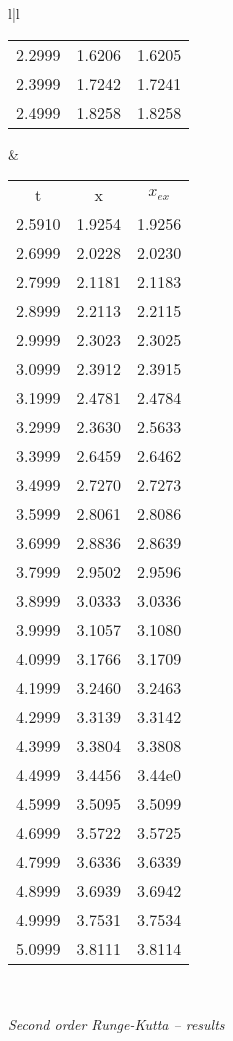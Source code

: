 \begin{figure}
\begin{tabular}{l|l}
\begin{tabular}{ccc}
                2.2999 & 1.6206 & 1.6205  \\
                2.3999 & 1.7242 & 1.7241  \\
                2.4999 & 1.8258 & 1.8258  \\
            \end{tabular}
&
        \begin{tabular}{ccc}
            \multicolumn{1}{c}{t} &  \multicolumn{1}{c}{x}  & \multicolumn{1}{c}{$x_{ex}$}\\
            2.5910 & 1.9254 & 1.9256 \\ 
            2.6999 & 2.0228 & 2.0230 \\ 
            2.7999 & 2.1181 & 2.1183 \\ 
            2.8999 & 2.2113 & 2.2115 \\ 
            2.9999 & 2.3023 & 2.3025 \\ 
            3.0999 & 2.3912 & 2.3915 \\ 
            3.1999 & 2.4781 & 2.4784 \\ 
            3.2999 & 2.3630 & 2.5633 \\ 
            3.3999 & 2.6459 & 2.6462 \\ 
            3.4999 & 2.7270 & 2.7273 \\ 
            3.5999 & 2.8061 & 2.8086 \\ 
            3.6999 & 2.8836 & 2.8639 \\ 
            3.7999 & 2.9502 & 2.9596 \\ 
            3.8999 & 3.0333 & 3.0336 \\ 
            3.9999 & 3.1057 & 3.1080 \\ 
            4.0999 & 3.1766 & 3.1709 \\ 
            4.1999 & 3.2460 & 3.2463 \\ 
            4.2999 & 3.3139 & 3.3142 \\ 
            4.3999 & 3.3804 & 3.3808 \\ 
            4.4999 & 3.4456 & 3.44e0 \\ 
            4.5999 & 3.5095 & 3.5099 \\ 
            4.6999 & 3.5722 & 3.5725 \\ 
            4.7999 & 3.6336 & 3.6339 \\ 
            4.8999 & 3.6939 & 3.6942 \\ 
            4.9999 & 3.7531 & 3.7534 \\ 
            5.0999 & 3.8111 & 3.8114 \\ 
        \end{tabular}
        \\
\end{tabular}
    \caption{\textit{Second order Runge-Kutta -- results}}
    \label{fig:06_08}
\end{figure}

